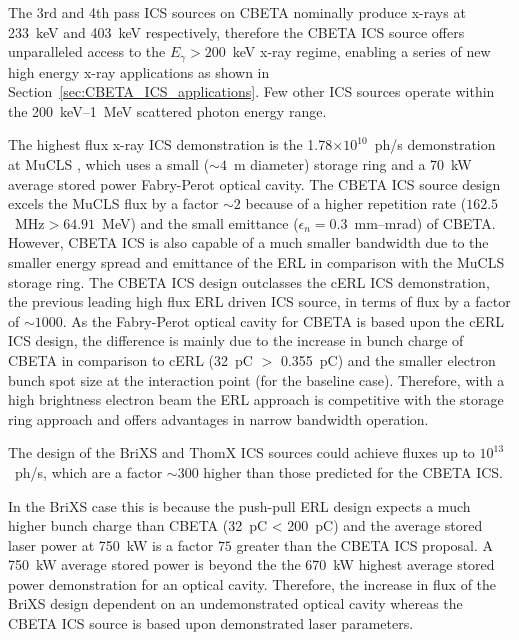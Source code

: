 \documentclass[../main.tex]{subfiles}
\begin{document}
The 3rd and 4th pass ICS sources on CBETA nominally produce x-rays at 233~\si{\kilo\electronvolt} and 403~\si{\kilo\electronvolt} respectively, therefore the CBETA ICS source offers unparalleled access to the $E_{\gamma} > 200$~\si{\kilo\electronvolt} x-ray regime, enabling a series of new high energy x-ray applications as shown in Section~\ref{sec:CBETA_ICS_applications}. Few other ICS sources operate within the 200~\si{\kilo\electronvolt}--1~\si{\mega\electronvolt} scattered photon energy range.

The highest flux x-ray ICS demonstration is the 1.78$\times 10^{10}$~ph/\si{\second} demonstration at MuCLS \cite{eggl2016munich}, which uses a small ($\sim4$~\si{\meter} diameter) storage ring and a 70~\si{\kilo\watt} average stored power Fabry-Perot optical cavity. The CBETA ICS source design excels the MuCLS flux by a factor $\sim2$ because of a higher repetition rate ($162.5$~\si{\mega\hertz}$>64.91$~\si{\mega\electronvolt}) and the small emittance ($\epsilon_{n}=0.3$~\si{\milli\meter}--\si{\milli\radian}) of CBETA. However, CBETA ICS is also capable of a much smaller bandwidth due to the smaller energy spread and emittance of the ERL in comparison with the MuCLS storage ring. The CBETA ICS design outclasses the cERL ICS demonstration, the previous leading high flux ERL driven ICS source, in terms of flux by a factor of $\sim1000$. As the Fabry-Perot optical cavity for CBETA is based upon the cERL ICS design, the difference is mainly due to the increase in bunch charge of CBETA in comparison to cERL (32~\si{\pico\coulomb} $>$ 0.355~\si{\pico\coulomb}) and the smaller electron bunch spot size at the interaction point (for the baseline case). Therefore, with a high brightness electron beam the ERL approach is competitive with the storage ring approach and offers advantages in narrow bandwidth operation. 

The design of the BriXS and ThomX ICS sources could achieve fluxes up to $10^{13}$~ph/\si{\second}, which are a factor $\sim300$ higher than those predicted for the CBETA ICS. 

In the BriXS case this is because the push-pull ERL design expects a much higher bunch charge than CBETA (32~\si{\pico\coulomb} < 200~\si{\pico\coulomb}) \cite{drebot2019brixs} and the average stored laser power at 750~\si{\kilo\watt} \cite{drebot2019brixs} is a factor $75$ greater than the CBETA ICS proposal. A 750~\si{\kilo\watt} average stored power is beyond the the 670~\si{\kilo\watt} highest average stored power demonstration \cite{carstens2014megawatt} for an optical cavity. Therefore, the increase in flux of the BriXS design dependent on an undemonstrated optical cavity whereas the CBETA ICS source is based upon demonstrated laser parameters.
\end{document}
